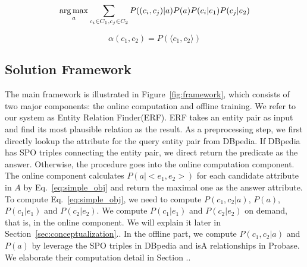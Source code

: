 \begin{equation}
\label{eq:simple_obj}
 \operatorname*{arg\,max}_a \sum_{c_i\in C_1, c_j\in C_2} P((c_{i},c_{j})|a) P(a) P(c_i|e_1) P(c_j|e_2)
\end{equation}

\begin{equation}\label{eq:rel_jdp}
  \alpha(c_1,c_2) = P(\langle c_1, c_2\rangle)
\end{equation}






\subsection{Solution Framework}
The main framework is illustrated in Figure~\ref{fig:framework}, which consists of two major components: the online computation and offline training. We refer to our system as \ac{Entity Relation Finder(ERF)}.
ERF takes an entity pair as input and find its most plausible relation as the result.
As a preprocessing step, we first directly lookup the attribute for the query entity pair from DBpedia.
If DBpedia has SPO triples connecting the entity pair, we direct return the predicate as the answer.
Otherwise, the procedure goes into the online computation component.
The online component calculates $ P(a| <e_1,e_2> )$ for each candidate attribute in $A$ by Eq.~\ref{eq:simple_obj} and return the maximal one as the answer attribute. To compute Eq.~\ref{eq:simple_obj}, we need to compute $P(c_1,c_2|a)$, $P(a)$, $P(c_1|e_1)$ and $P(c_2|e_2)$. We compute $P(c_1|e_1)$ and $P(c_2|e_2)$ on demand, that is, in the online component. We will explain it later in Section~\ref{sec:conceptualization}.. 
In the offline part, we compute $P(c_1,c_2|a)$ and $P(a)$ by leverage the SPO triples in DBpedia and isA relationships in Probase.
We elaborate their computation detail in Section ..

